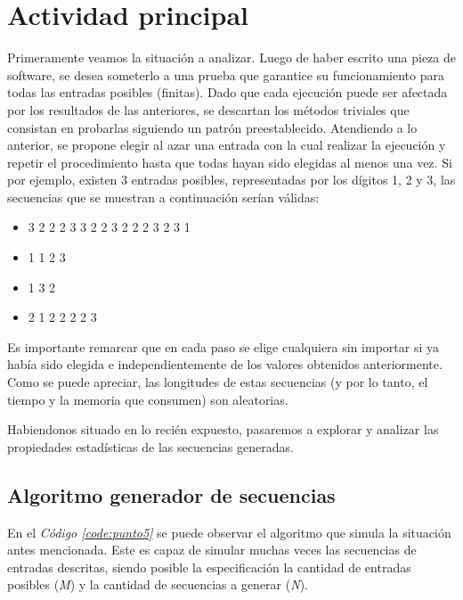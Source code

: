 \documentclass{article}
\newcommand{\refcode}[1]{\textit{Código \ref{#1}}}
\begin{document}
\section{Actividad principal}

	Primeramente veamos la situación a analizar. Luego de haber escrito una pieza de software, se desea someterlo a una prueba que garantice su funcionamiento para todas las entradas posibles (finitas). Dado que cada ejecución puede ser afectada por los resultados de las anteriores, se descartan los métodos triviales que consistan en probarlas siguiendo un patrón preestablecido.
	Atendiendo a lo anterior, se propone elegir al azar una entrada con la cual realizar la ejecución y repetir el procedimiento hasta que todas hayan sido elegidas al menos una vez. Si por ejemplo, existen 3 entradas posibles, representadas por los dígitos 1, 2 y 3, las secuencias que se muestran a continuación serían válidas:

\begin{itemize}
\itemsep=2pt \topsep=0pt \partopsep=0pt \parskip=0pt \parsep=0pt
	\item 3 2 2 2 3 3 2 2 3 2 2 2 3 2 3 1
	\item 1 1 2 3
	\item 1 3 2
	\item 2 1 2 2 2 2 3
\end{itemize}

	Es importante remarcar que en cada paso se elige cualquiera sin importar si ya había sido elegida e independientemente de los valores obtenidos anteriormente. Como se puede apreciar, las longitudes de estas secuencias (y por lo tanto, el tiempo y la memoria que consumen) son aleatorias.
	\par 
	Habiendonos situado en lo recién expuesto, pasaremos a explorar y analizar las propiedades estadísticas de las secuencias generadas.



\subsection{Algoritmo generador de secuencias}

En el \refcode{code:punto5} se puede observar el algoritmo que simula la situación antes mencionada. Este es capaz de simular muchas veces las secuencias de entradas descritas, siendo posible la especificación la cantidad de entradas posibles (\textit{M}) y la cantidad de secuencias a generar (\textit{N}).
\end{document}
